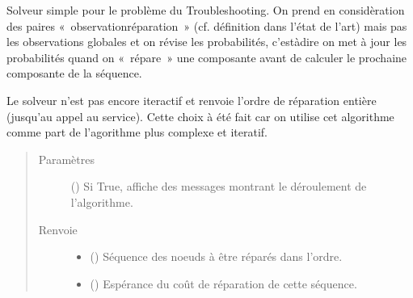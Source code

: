 \documentclass[letterpaper,10pt,french]{sphinxmanual}
\begin{document}
\begin{fulllineitems}
\begin{fulllineitems}
\label{\detokenize{index:DecisionTheoreticTroubleshooting.TroubleShootingProblem.simple_solver_obs}}
Solveur simple pour le problème du Troubleshooting.
On prend en considèration des paires « observation\sphinxhyphen{}réparation » (cf.
définition dans l’état de l’art) mais pas les observations globales
et on révise les probabilités, c’est\sphinxhyphen{}à\sphinxhyphen{}dire on met à jour les
probabilités quand on « répare » une composante avant de calculer le
prochaine composante de la séquence.

Le solveur n’est pas encore iteractif et renvoie l’ordre de réparation
entière (jusqu’au appel au service). Cette choix à été fait car on
utilise cet algorithme comme part de l’agorithme plus complexe et
iteratif.
\begin{quote}\begin{description}
\item[{Paramètres}] \leavevmode
{} (\sphinxstyleliteralemphasis{\sphinxupquote{, }}) \textendash{} Si True, affiche des messages montrant le déroulement de
l’algorithme.

\item[{Renvoie}] \leavevmode
\begin{itemize}
\item {} 
 () \textendash{} Séquence des noeuds à être réparés dans l’ordre.

\item {} 
 () \textendash{} Espérance du coût de réparation de cette séquence.

\end{itemize}


\end{description}\end{quote}

\end{fulllineitems}



\end{fulllineitems}
\end{document}
